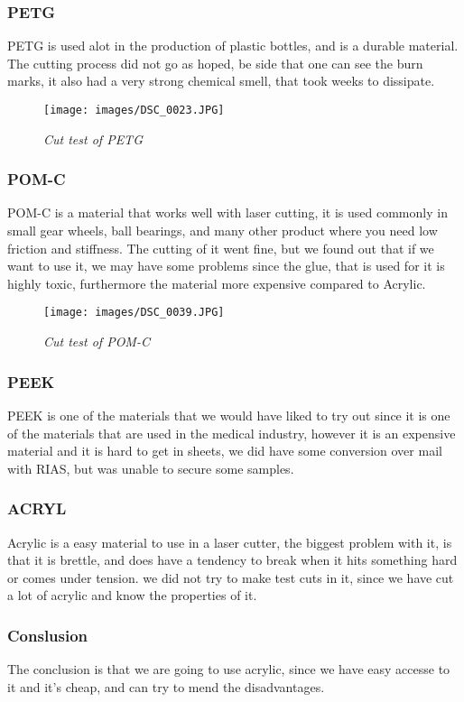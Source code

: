 \subsubsection{PETG}
PETG is used alot in the production of plastic bottles, and is a durable material.
The cutting process did not go as hoped, be side that one can see the burn marks, it also had a very strong chemical smell, that took weeks to dissipate.
\begin{figure}[!h]
	\centering
	\texttt{[image: images/DSC\_0023.JPG]}
	\caption{\small {\it {Cut test of PETG}}} \label{fig:PETG}
\end{figure}
\FloatBarrier
\subsubsection{POM-C}
POM-C is a material that works well with laser cutting, it is used commonly in small gear wheels, ball bearings, and many other product where you need low friction and stiffness.
The cutting of it went fine, but we found out that if we want to use it, we may have some problems since the glue, that is used for it is highly toxic, furthermore the material more expensive compared to Acrylic.
\begin{figure}[!h]
	\centering
	\texttt{[image: images/DSC\_0039.JPG]}
	\caption{\small {\it {Cut test of POM-C}}} \label{fig:POM-C}
\end{figure}
\FloatBarrier

\subsubsection{PEEK}
PEEK is one of the materials that we would have liked to try out since it is one of the materials that are used in the medical industry, however it is an expensive material and it is hard to get in sheets, we did have some conversion over mail with RIAS, but was unable to secure some samples.

\subsubsection{ACRYL}
Acrylic is a easy material to use in a laser cutter, the biggest problem with it, is that it is brettle, and does have a tendency to break when it hits something hard or comes under tension.
we did not try to make test cuts in it, since we have cut a lot of acrylic and know the properties of it.


\subsubsection{Conslusion}
The conclusion is that we are going to use acrylic, since we have easy accesse to it and it's cheap, and can try to mend the disadvantages.


